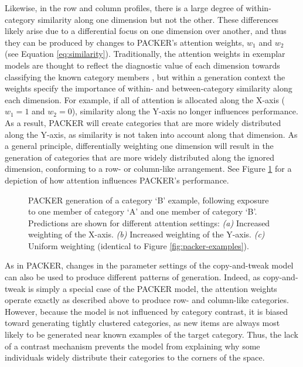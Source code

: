 \documentclass[12pt]{article}
\newcommand\inputpgf[2]{{
\let\pgfimageWithoutPath\pgfimage
\renewcommand{\pgfimage}[2][]{\pgfimageWithoutPath[##1]{#1/##2}}

}}
\begin{document}
\begin{flushleft}
Likewise, in the row and column profiles, there is a large degree of within-category similarity along one dimension but not the other. These differences likely arise due to a differential focus on one dimension over another, and thus they can be produced by changes to PACKER's attention weights, $w_1$ and $w_2$ (see Equation \ref{eq:similarity}). Traditionally, the attention weights in exemplar models are thought to reflect the diagnostic value of each dimension towards classifying the known category members \citep{nosofsky1984choice,nosofsky1986attention,kruschke1992alcove}, but within a generation context the weights specify the importance of within- and between-category similarity along each dimension. For example, if all of attention is allocated along the X-axis ($w_1=1$ and $w_2=0$), similarity along the Y-axis no longer influences performance. As a result, PACKER will create categories that are more widely distributed along the Y-axis, as similarity is not taken into account along that dimension. As a general principle, differentially weighting one dimension will result in the generation of categories that are more widely distributed along the ignored dimension, conforming to a row- or column-like arrangement. See Figure \ref{fig:packer-attention} for a depiction of how attention influences PACKER's performance. 

\begin{figure}
    \begin{center}
    \inputpgf{figs/}{packer-attention-examples.pgf}
    \caption{PACKER generation of a category `B' example, following exposure to one member of category `A' and one member of category `B'. Predictions are shown for different attention settings: {\em (a)} Increased weighting of the X-axis. {\em (b)} Increased weighting of the Y-axis. {\em (c)} Uniform weighting (identical to Figure \ref{fig:packer-examples}).}
    \label{fig:packer-attention}
    \end{center}
\end{figure}

As in PACKER, changes in the parameter settings of the copy-and-tweak model can also be used to produce different patterns of generation. Indeed, as copy-and-tweak is simply a special case of the PACKER model, the attention weights operate exactly as described above to produce row- and column-like categories. However, because the model is not influenced by category contrast, it is biased toward generating tightly clustered categories, as new items are always most likely to be generated near known examples of the target category. Thus, the lack of a contrast mechanism prevents the model from explaining why some individuals widely distribute their categories to the corners of the space.


\end{flushleft}
\end{document}
